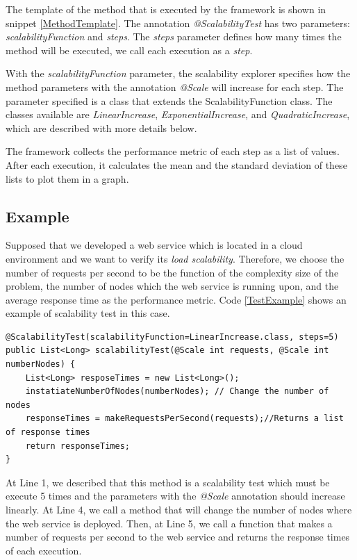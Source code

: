 The template of the method that is executed by the framework is shown in snippet \ref{MethodTemplate}. The annotation \emph{@ScalabilityTest} has two parameters: \emph{scalabilityFunction} and \emph{steps}. The \emph{steps} parameter defines how many times the method will be executed, we call each execution as a \emph{step}.

With the \emph{scalabilityFunction} parameter, the scalability explorer specifies how the method parameters with the annotation \emph{@Scale} will increase for each step. The parameter specified is a class that extends the ScalabilityFunction class. The classes available are \emph{LinearIncrease}, \emph{ExponentialIncrease}, and \emph{QuadraticIncrease}, which are described with more details below.

The framework collects the performance metric of each step as a list of values. After each execution, it calculates the mean and the standard deviation of these lists to plot them in a graph.

\subsection{Example}

Supposed that we developed a web service which is located in a cloud environment and we want to verify its \emph{load scalability}. Therefore, we choose the number of requests per second to be the function of the complexity size of the problem, the number of nodes which the web service is running upon, and the average response time as the performance metric. Code \ref{TestExample} shows an example of scalability test in this case.
\begin{lstlisting}
@ScalabilityTest(scalabilityFunction=LinearIncrease.class, steps=5)
public List<Long> scalabilityTest(@Scale int requests, @Scale int numberNodes) {
	List<Long> resposeTimes = new List<Long>();
	instatiateNumberOfNodes(numberNodes); // Change the number of nodes
	responseTimes = makeRequestsPerSecond(requests);//Returns a list of response times
	return responseTimes;
}
\end{lstlisting}

At Line 1, we described that this method is a scalability test which must be execute 5 times  and the parameters with the \emph{@Scale} annotation should increase linearly. At Line 4, we call a method that will change the number of nodes where the web service is deployed. Then, at Line 5, we call a function that makes a number of requests per second to the web service and returns the response times of each execution.

